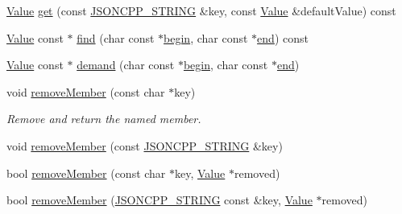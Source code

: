 \begin{DoxyCompactItemize}
\item 
\hyperlink{classJson_1_1Value}{Value} \hyperlink{classJson_1_1Value_a7406e6af727c288bf8ab59945ece686a_a7406e6af727c288bf8ab59945ece686a}{get} (const \hyperlink{json_8h_a1e723f95759de062585bc4a8fd3fa4be_a1e723f95759de062585bc4a8fd3fa4be}{J\+S\+O\+N\+C\+P\+P\+\_\+\+S\+T\+R\+I\+NG} \&key, const \hyperlink{classJson_1_1Value}{Value} \&default\+Value) const
\item 
\hyperlink{classJson_1_1Value}{Value} const  $\ast$ \hyperlink{classJson_1_1Value_afb007b9ce9b2cf9d5f667a07e5e0349f_afb007b9ce9b2cf9d5f667a07e5e0349f}{find} (char const $\ast$\hyperlink{classJson_1_1Value_a015459a3950c198d63a2d3be8f5ae296_a015459a3950c198d63a2d3be8f5ae296}{begin}, char const $\ast$\hyperlink{classJson_1_1Value_a3e443cd0ef24f7e028b175e47ee045e0_a3e443cd0ef24f7e028b175e47ee045e0}{end}) const
\item 
\hyperlink{classJson_1_1Value}{Value} const  $\ast$ \hyperlink{classJson_1_1Value_afeb7ff596a0929d90c5f2f3cffb413ed_afeb7ff596a0929d90c5f2f3cffb413ed}{demand} (char const $\ast$\hyperlink{classJson_1_1Value_a015459a3950c198d63a2d3be8f5ae296_a015459a3950c198d63a2d3be8f5ae296}{begin}, char const $\ast$\hyperlink{classJson_1_1Value_a3e443cd0ef24f7e028b175e47ee045e0_a3e443cd0ef24f7e028b175e47ee045e0}{end})
\item 
void \hyperlink{classJson_1_1Value_a92e165f04105d27a930fb3a18a053585_a92e165f04105d27a930fb3a18a053585}{remove\+Member} (const char $\ast$key)
\begin{DoxyCompactList}\small\item\em Remove and return the named member. \end{DoxyCompactList}\item 
void \hyperlink{classJson_1_1Value_a8a660202bbad35857b39e85bd35ec78a_a8a660202bbad35857b39e85bd35ec78a}{remove\+Member} (const \hyperlink{json_8h_a1e723f95759de062585bc4a8fd3fa4be_a1e723f95759de062585bc4a8fd3fa4be}{J\+S\+O\+N\+C\+P\+P\+\_\+\+S\+T\+R\+I\+NG} \&key)
\item 
bool \hyperlink{classJson_1_1Value_a708e599489adf30d65bf85a8ee16e6fb_a708e599489adf30d65bf85a8ee16e6fb}{remove\+Member} (const char $\ast$key, \hyperlink{classJson_1_1Value}{Value} $\ast$removed)
\item 
bool \hyperlink{classJson_1_1Value_ae385ecef98427970df525ee876e9f54a_ae385ecef98427970df525ee876e9f54a}{remove\+Member} (\hyperlink{json_8h_a1e723f95759de062585bc4a8fd3fa4be_a1e723f95759de062585bc4a8fd3fa4be}{J\+S\+O\+N\+C\+P\+P\+\_\+\+S\+T\+R\+I\+NG} const \&key, \hyperlink{classJson_1_1Value}{Value} $\ast$removed)

\end{DoxyCompactItemize}
